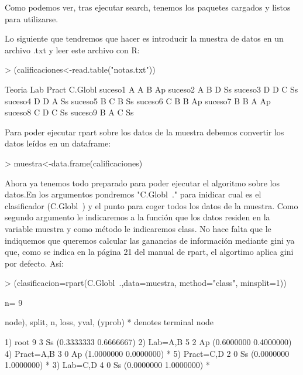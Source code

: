 \documentclass[a4paper]{article}
\begin{document}
Como podemos ver, tras ejecutar search, tenemos los paquetes cargados y listos para utilizarse.

Lo siguiente que tendremos que hacer es introducir la muestra de datos en un archivo .txt y leer este archivo con R:
\begin{Schunk}
\begin{Sinput}
> (calificaciones<-read.table("notas.txt"))
\end{Sinput}
\begin{Soutput}
        Teoria Lab Pract C.Globl
suceso1      A   A     B      Ap
suceso2      A   B     D      Ss
suceso3      D   D     C      Ss
suceso4      D   D     A      Ss
suceso5      B   C     B      Ss
suceso6      C   B     B      Ap
suceso7      B   B     A      Ap
suceso8      C   D     C      Ss
suceso9      B   A     C      Ss
\end{Soutput}
\end{Schunk}

Para poder ejecutar rpart sobre los datos de la muestra debemos convertir los datos leídos en un dataframe:
\begin{Schunk}
\begin{Sinput}
> muestra<-data.frame(calificaciones)
\end{Sinput}
\end{Schunk}

Ahora ya tenemos todo preparado para poder ejecutar el algoritmo sobre los datos.En los argumentos pondremos "C.Globl~." para inidicar cual es el clasificador (C.Globl~) y el punto para coger todos los datos de la muestra. Como segundo argumento le indicaremos a la función que los datos residen en la variable muestra y como método le indicaremos class. No hace falta que le indiquemos que queremos calcular las ganancias de información mediante gini ya que, como se indica en la página 21 del manual de rpart, el algortimo aplica gini por defecto. Así:
\begin{Schunk}
\begin{Sinput}
> (clasificacion=rpart(C.Globl~.,data=muestra, method="class", minsplit=1))
\end{Sinput}
\begin{Soutput}
n= 9 

node), split, n, loss, yval, (yprob)
      * denotes terminal node

1) root 9 3 Ss (0.3333333 0.6666667)  
  2) Lab=A,B 5 2 Ap (0.6000000 0.4000000)  
    4) Pract=A,B 3 0 Ap (1.0000000 0.0000000) *
    5) Pract=C,D 2 0 Ss (0.0000000 1.0000000) *
  3) Lab=C,D 4 0 Ss (0.0000000 1.0000000) *
\end{Soutput}
\end{Schunk}
\end{document}
